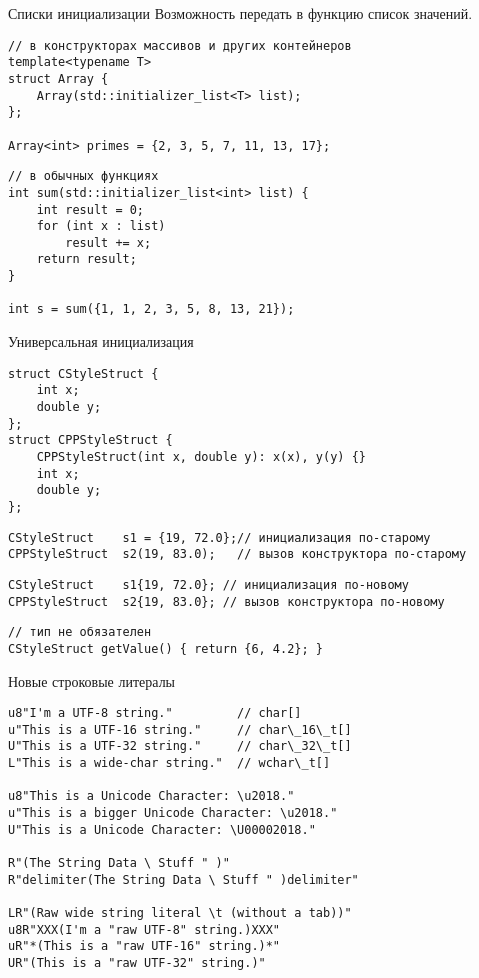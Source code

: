 \documentclass{beamer}
\begin{document}
\begin{frame}[fragile]{Списки инициализации}
Возможность передать в функцию список значений.
\begin{lstlisting}
// в конструкторах массивов и других контейнеров
template<typename T>
struct Array {
    Array(std::initializer_list<T> list);
};

Array<int> primes = {2, 3, 5, 7, 11, 13, 17};
\end{lstlisting}

\begin{lstlisting}
// в обычных функциях
int sum(std::initializer_list<int> list) {
    int result = 0;
    for (int x : list) 
        result += x;
    return result;
}

int s = sum({1, 1, 2, 3, 5, 8, 13, 21});
\end{lstlisting}
\end{frame}

\begin{frame}[fragile]{Универсальная инициализация}
\begin{lstlisting}
struct CStyleStruct {
    int x;
    double y;
};
struct CPPStyleStruct {
    CPPStyleStruct(int x, double y): x(x), y(y) {}
    int x;
    double y;
};
\end{lstlisting}

\begin{lstlisting}
CStyleStruct 	s1 = {19, 72.0};// инициализация по-старому
CPPStyleStruct  s2(19, 83.0); 	// вызов конструктора по-старому
\end{lstlisting}

\begin{lstlisting}
CStyleStruct 	s1{19, 72.0}; // инициализация по-новому
CPPStyleStruct  s2{19, 83.0}; // вызов конструктора по-новому
\end{lstlisting}

\begin{lstlisting}
// тип не обязателен
CStyleStruct getValue() { return {6, 4.2}; } 
\end{lstlisting}
\end{frame}

\begin{frame}[fragile]{Новые строковые литералы}
\begin{lstlisting}
u8"I'm a UTF-8 string."         // char[]
u"This is a UTF-16 string."     // char\_16\_t[]
U"This is a UTF-32 string."     // char\_32\_t[]
L"This is a wide-char string."  // wchar\_t[]

u8"This is a Unicode Character: \u2018."
u"This is a bigger Unicode Character: \u2018."
U"This is a Unicode Character: \U00002018."

R"(The String Data \ Stuff " )"
R"delimiter(The String Data \ Stuff " )delimiter"

LR"(Raw wide string literal \t (without a tab))"
u8R"XXX(I'm a "raw UTF-8" string.)XXX"
uR"*(This is a "raw UTF-16" string.)*"
UR"(This is a "raw UTF-32" string.)"
\end{lstlisting}
\end{frame}
\end{document}
